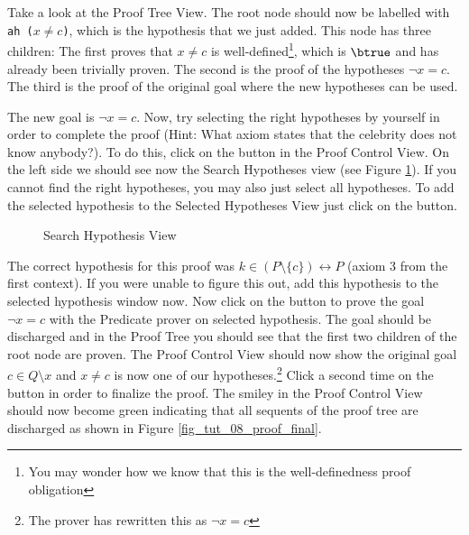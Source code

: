 
Take a look at the Proof Tree View. The root node should now be labelled with \texttt{ah ($x\neq c$)},
  which is the hypothesis that we just added.
This node has three children: The first proves that $x\neq c$ is well-defined\footnote{You may wonder how we know that this is the well-definedness proof obligation}, which is $\btrue$ and has already been trivially proven.
The second is the proof of the hypotheses $\lnot x=c$.
The third is the proof of the original goal where the new hypotheses can be used.

The new goal is $\lnot x = c$. Now, try selecting the right hypotheses by yourself in order to complete the proof (Hint: What axiom states that the celebrity does not know anybody?). To do this, click on the  button in the \textsf{Proof Control View}. On the left side we should see now the \textsf{Search Hypotheses} view (see Figure \ref{fig_tut_08_search_hypothesis}). If you cannot find the right hypotheses, you may also just select all hypotheses. To add the selected hypothesis to the \textsf{Selected Hypotheses View} just click on the  button. 


\begin{figure}[!ht]
\begin{center}
	\caption{Search Hypothesis View}
	\label{fig_tut_08_search_hypothesis}
\end{center}
\end{figure}

The correct hypothesis for this proof was $k \in  (P \setminus  \{ c\} ) \rel  P$ (axiom 3 from the first context). If you were unable to figure this out, add this hypothesis to the selected hypothesis window now. Now click on the  button to prove the goal $\lnot x = c$ with the \textsf{Predicate prover on selected hypothesis}. The goal should be discharged and in the Proof Tree you should see that the first two children of the root node are proven. The \textsf{Proof Control View} should now show the original goal $c \in Q \setminus {x}$ and $x\neq c$ is now one of our hypotheses.\footnote{The prover has rewritten this as $ \lnot x = c$} Click a second time on the  button in order to finalize the proof. The smiley in the \textsf{Proof Control View} should now become green indicating that all sequents of the proof tree are discharged as shown in Figure \ref{fig_tut_08_proof_final}.

